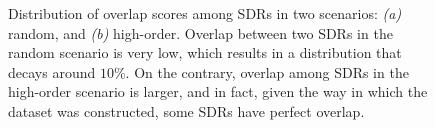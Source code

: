 \documentclass[11pt,letterpaper]{article}
\begin{document}
		\begin{figure}[t]
			\centering
			\caption{
                Distribution of overlap scores among SDRs in two scenarios:
                \emph{(a)} random, and \emph{(b)} high-order.
                Overlap between two SDRs in the random scenario is very low,
                which results in a distribution that decays around $10\%$.
                On the contrary, overlap among SDRs in the high-order scenario
                is larger, and in fact, given the way in which the dataset was
                constructed, some SDRs have perfect overlap.
			}
			\label{fig4}
		\end{figure}  
        
\end{document}
